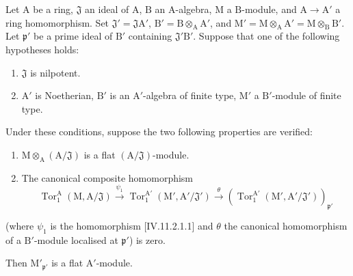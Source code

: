 \begin{lemma}[11.2.5]
\label{IV.11.2.5}
Let $\mathrm{A}$ be a ring, $\mathfrak{J}$ an ideal of $\mathrm{A}$,
$\mathrm{B}$ an $\mathrm{A}$-algebra, $\mathrm{M}$ a
$\mathrm{B}$-module, and $\mathrm{A}\to\mathrm{A}'$ a ring
homomorphism. Set
$\mathfrak{J}'=\mathfrak{J}\mathrm{A}'$,
$\mathrm{B}'=\mathrm{B}\otimes_\mathrm{A}\mathrm{A}'$, and
$\mathrm{M}'=\mathrm{M}\otimes_\mathrm{A}\mathrm{A}'
=\mathrm{M}\otimes_\mathrm{B}\mathrm{B}'$. Let
$\mathfrak{p}'$ be a prime ideal of $\mathrm{B}'$ containing
$\mathfrak{J}'\mathrm{B}'$. Suppose that one of the following
hypotheses holds:
\begin{enumerate}[label=\emph{\alph*)}]
  \item $\mathfrak{J}$ is nilpotent.
  \item $\mathrm{A}'$ is Noetherian, $\mathrm{B}'$ is an $\mathrm{A}'$-algebra of finite type, $\mathrm{M}'$ a $\mathrm{B}'$-module of finite type.
\end{enumerate}
Under these conditions, suppose the two following properties are verified:
\begin{enumerate}[label=\emph{(\roman*)}]
  \item $\mathrm{M}\otimes_\mathrm{A}(\mathrm{A}/\mathfrak{J})$ is a flat $(\mathrm{A}/\mathfrak{J})$-module.
  \item The canonical composite homomorphism
\[
  \operatorname{Tor}_1^\mathrm{A}(\mathrm{M},\mathrm{A}/\mathfrak{J})\xrightarrow{\psi_1}\operatorname{Tor}_1^{\mathrm{A}'}(\mathrm{M}',\mathrm{A}'/\mathfrak{J}')\xrightarrow{\theta}(\operatorname{Tor}_1^{\mathrm{A}'}(\mathrm{M}',\mathrm{A}'/\mathfrak{J}'))_{\mathfrak{p}'}
\]
\end{enumerate}
(where $\psi_1$ is the homomorphism [IV.11.2.1.1] and $\theta$ the canonical homomorphism of a $\mathrm{B}'$-module localised at $\mathfrak{p}'$) is zero.

Then $\mathrm{M}'_{\mathfrak{p}'}$ is a flat $\mathrm{A}'$-module.
\end{lemma}

